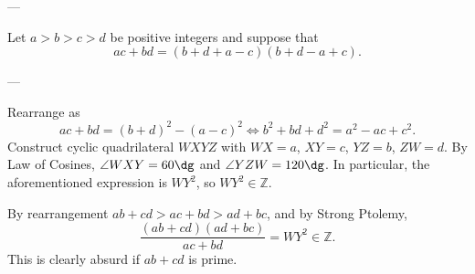 
---

Let $a>b>c>d$ be positive integers and suppose that \[ac+bd=(b+d+a-c)(b+d-a+c).\]

---

Rearrange as \[ac+bd=(b+d)^2-(a-c)^2\iff b^2+bd+d^2=a^2-ac+c^2.\]
Construct cyclic quadrilateral $WXYZ$ with $WX=a$, $XY=c$, $YZ=b$, $ZW=d$. By Law of Cosines, $\angle WXY=60\dg$ and $\angle YZW=120\dg$. In particular, the aforementioned expression is $WY^2$, so $WY^2\in\mathbb Z$.

By rearrangement $ab+cd>ac+bd>ad+bc$, and by Strong Ptolemy, \[\frac{(ab+cd)(ad+bc)}{ac+bd}=WY^2\in\mathbb Z.\]
This is clearly absurd if $ab+cd$ is prime.

